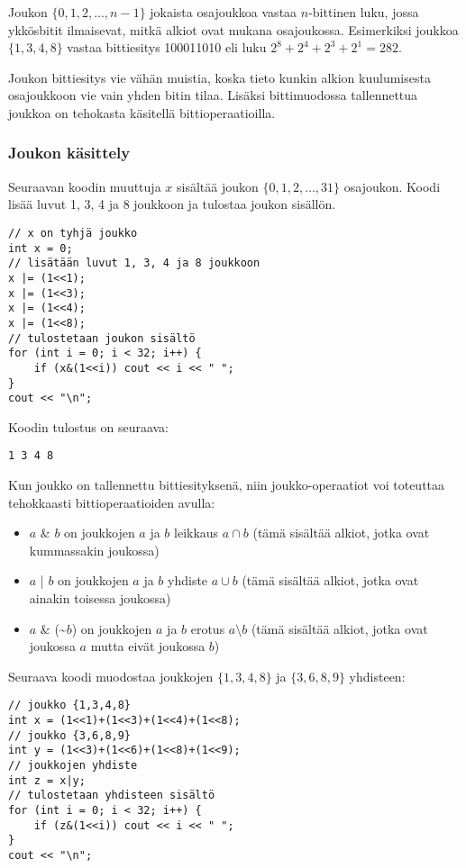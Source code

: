 Joukon $\{0,1,2,\ldots,n-1\}$
jokaista osajoukkoa
vastaa $n$-bittinen luku,
jossa ykkösbitit ilmaisevat,
mitkä alkiot ovat mukana osajoukossa.
Esimerkiksi joukkoa $\{1,3,4,8\}$
vastaa bittiesitys 100011010 eli luku
$2^8+2^4+2^3+2^1=282$.

Joukon bittiesitys vie vähän muistia,
koska tieto kunkin alkion kuulumisesta
osajoukkoon vie vain yhden bitin tilaa.
Lisäksi bittimuodossa tallennettua joukkoa
on tehokasta käsitellä bittioperaatioilla.

\subsubsection{Joukon käsittely}

Seuraavan koodin muuttuja $x$
sisältää joukon $\{0,1,2,\ldots,31\}$
osajoukon.
Koodi lisää luvut 1, 3, 4 ja 8
joukkoon ja tulostaa
joukon sisällön.

\begin{lstlisting}
// x on tyhjä joukko
int x = 0;
// lisätään luvut 1, 3, 4 ja 8 joukkoon
x |= (1<<1);
x |= (1<<3);
x |= (1<<4);
x |= (1<<8);
// tulostetaan joukon sisältö
for (int i = 0; i < 32; i++) {
    if (x&(1<<i)) cout << i << " ";
}
cout << "\n";
\end{lstlisting}

Koodin tulostus on seuraava:
\begin{lstlisting}
1 3 4 8
\end{lstlisting}

Kun joukko on tallennettu bittiesityksenä,
niin joukko-operaatiot voi toteuttaa 
tehokkaasti bittioperaatioiden avulla:
\begin{itemize}
\item $a$ \& $b$ on joukkojen $a$ ja $b$ leikkaus $a \cap b$
(tämä sisältää alkiot,
jotka ovat kummassakin joukossa)
\item $a$ | $b$ on joukkojen $a$ ja $b$ yhdiste $a \cup b$
(tämä sisältää alkiot,
jotka ovat ainakin toisessa joukossa)
\item $a$ \& (\textasciitilde$b$) on joukkojen $a$ ja $b$ erotus
$a \setminus b$ (tämä sisältää alkiot,
jotka ovat joukossa $a$ mutta eivät joukossa $b$)
\end{itemize}

Seuraava koodi muodostaa
joukkojen $\{1,3,4,8\}$ ja $\{3,6,8,9\}$ yhdisteen:

\begin{lstlisting}
// joukko {1,3,4,8}
int x = (1<<1)+(1<<3)+(1<<4)+(1<<8);
// joukko {3,6,8,9}
int y = (1<<3)+(1<<6)+(1<<8)+(1<<9);
// joukkojen yhdiste
int z = x|y;
// tulostetaan yhdisteen sisältö
for (int i = 0; i < 32; i++) {
    if (z&(1<<i)) cout << i << " ";
}
cout << "\n";
\end{lstlisting}

